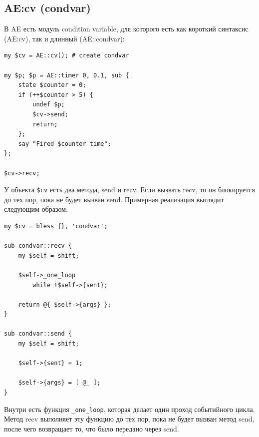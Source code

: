 \subsection{AE:cv (condvar)} %
В AE есть модуль condition variable, для которого есть как короткий синтаксис (AE:cv), так и длинный (AE::condvar):
\begin{verbatim}
my $cv = AE::cv(); # create condvar

my $p; $p = AE::timer 0, 0.1, sub {
    state $counter = 0;
    if (++$counter > 5) {
        undef $p;
        $cv->send;
        return;
    };
    say "Fired $counter time";
};

$cv->recv;
\end{verbatim}
У объекта \verb|$cv| есть два метода, send и recv. Если вызвать recv, то он блокируется до тех пор, пока не будет вызван send. Примерная реализация выглядит следующим образом:
\begin{verbatim}
my $cv = bless {}, 'condvar';

sub condvar::recv {
    my $self = shift;

    $self->_one_loop
        while !$self->{sent};

    return @{ $self->{args} };
}

sub condvar::send {
    my $self = shift;

    $self->{sent} = 1;

    $self->{args} = [ @_ ];
}
\end{verbatim}
Внутри есть функция \verb|_one_loop|, которая делает один проход событийного цикла. Метод recv выполняет эту функцию до тех пор, пока не будет вызван метод send, после чего возвращает то, что было передано через send.

